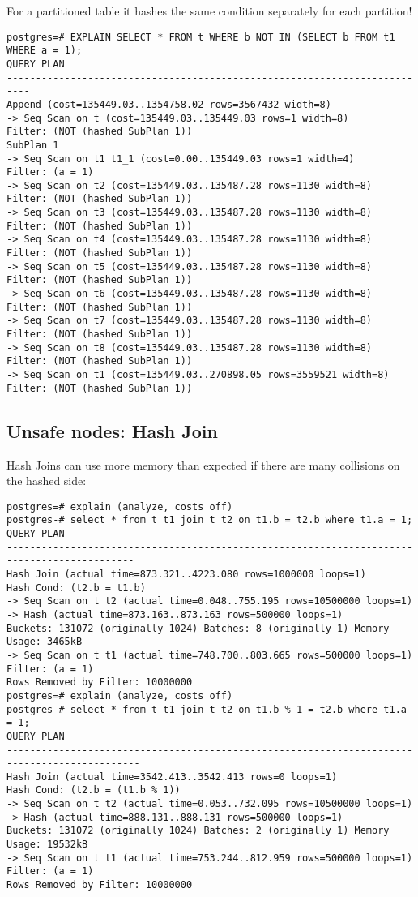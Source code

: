\documentclass[paper=letter, fontsize=12pt]{article}
\begin{document}
For a partitioned table it hashes the same condition separately for
each partition!
\begin{verbatim}
postgres=# EXPLAIN SELECT * FROM t WHERE b NOT IN (SELECT b FROM t1 WHERE a = 1);
QUERY PLAN
--------------------------------------------------------------------------
Append (cost=135449.03..1354758.02 rows=3567432 width=8)
-> Seq Scan on t (cost=135449.03..135449.03 rows=1 width=8)
Filter: (NOT (hashed SubPlan 1))
SubPlan 1
-> Seq Scan on t1 t1_1 (cost=0.00..135449.03 rows=1 width=4)
Filter: (a = 1)
-> Seq Scan on t2 (cost=135449.03..135487.28 rows=1130 width=8)
Filter: (NOT (hashed SubPlan 1))
-> Seq Scan on t3 (cost=135449.03..135487.28 rows=1130 width=8)
Filter: (NOT (hashed SubPlan 1))
-> Seq Scan on t4 (cost=135449.03..135487.28 rows=1130 width=8)
Filter: (NOT (hashed SubPlan 1))
-> Seq Scan on t5 (cost=135449.03..135487.28 rows=1130 width=8)
Filter: (NOT (hashed SubPlan 1))
-> Seq Scan on t6 (cost=135449.03..135487.28 rows=1130 width=8)
Filter: (NOT (hashed SubPlan 1))
-> Seq Scan on t7 (cost=135449.03..135487.28 rows=1130 width=8)
Filter: (NOT (hashed SubPlan 1))
-> Seq Scan on t8 (cost=135449.03..135487.28 rows=1130 width=8)
Filter: (NOT (hashed SubPlan 1))
-> Seq Scan on t1 (cost=135449.03..270898.05 rows=3559521 width=8)
Filter: (NOT (hashed SubPlan 1))
\end{verbatim}
\subsection{Unsafe nodes: Hash Join}
Hash Joins can use more memory than expected if there are many collisions on the hashed side:
\begin{verbatim}
postgres=# explain (analyze, costs off)
postgres-# select * from t t1 join t t2 on t1.b = t2.b where t1.a = 1;
QUERY PLAN
--------------------------------------------------------------------------------------------
Hash Join (actual time=873.321..4223.080 rows=1000000 loops=1)
Hash Cond: (t2.b = t1.b)
-> Seq Scan on t t2 (actual time=0.048..755.195 rows=10500000 loops=1)
-> Hash (actual time=873.163..873.163 rows=500000 loops=1)
Buckets: 131072 (originally 1024) Batches: 8 (originally 1) Memory Usage: 3465kB
-> Seq Scan on t t1 (actual time=748.700..803.665 rows=500000 loops=1)
Filter: (a = 1)
Rows Removed by Filter: 10000000
postgres=# explain (analyze, costs off)
postgres-# select * from t t1 join t t2 on t1.b % 1 = t2.b where t1.a = 1;
QUERY PLAN
---------------------------------------------------------------------------------------------
Hash Join (actual time=3542.413..3542.413 rows=0 loops=1)
Hash Cond: (t2.b = (t1.b % 1))
-> Seq Scan on t t2 (actual time=0.053..732.095 rows=10500000 loops=1)
-> Hash (actual time=888.131..888.131 rows=500000 loops=1)
Buckets: 131072 (originally 1024) Batches: 2 (originally 1) Memory Usage: 19532kB
-> Seq Scan on t t1 (actual time=753.244..812.959 rows=500000 loops=1)
Filter: (a = 1)
Rows Removed by Filter: 10000000
\end{verbatim}
\end{document}
